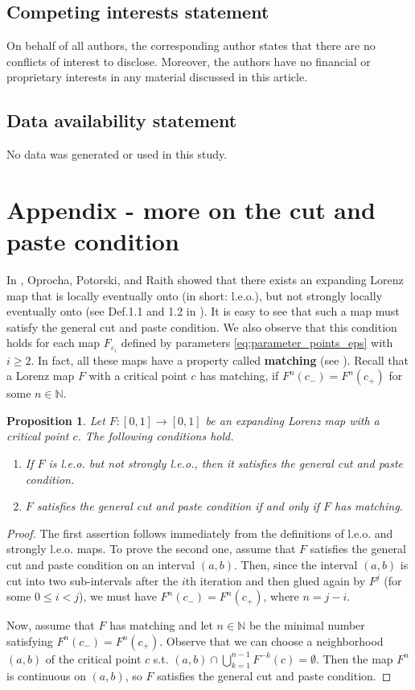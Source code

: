\documentclass[10pt,reqno]{amsart}
\theoremstyle{plain}
\theoremstyle{assumption}
\theoremstyle{notation}
\theoremstyle{claim}
\theoremstyle{conj}
\theoremstyle{theorem}
\theoremstyle{proposition}
\newtheorem{proposition}{Proposition}[section]
\theoremstyle{corollary}
\begin{document}
\subsection*{Competing interests statement}
On behalf of all authors, the corresponding author states that there are no conflicts of interest to disclose. Moreover, 
the authors have no financial or proprietary interests in any material discussed in this article.
\subsection*{Data availability statement}
No data was generated or used in this study.
\section{Appendix - more on the cut and paste condition}
\label{ex:map_nonsymmetric1}
In \cite{OPR}, Oprocha, Potorski, and Raith showed that there exists an expanding Lorenz map that is locally eventually onto (in short: l.e.o.), but not strongly locally eventually onto (see Def.1.1 and 1.2 in \cite{OPR}). It is easy to see that such a map must satisfy the general cut and paste condition. We also observe that this condition holds for each map $F_{\varepsilon_i}$ defined by parameters \eqref{eq:parameter_points_eps} with $i\geq2$. In fact, all these maps have a property called \textbf{matching} (see \cite{Bruin1,Bruin2}). Recall that a Lorenz map $F$ with a critical point $c$ has matching, if $F^n(c_-)=F^n(c_+)$ for some $n\in\mathbb{N}$.

\begin{proposition}\label{prop:cutandpaste}
    Let $F\colon[0,1]\to[0,1]$ be an expanding Lorenz map with a critical point $c$. The following conditions hold.
    \begin{enumerate}
        \item If $F$ is l.e.o. but not strongly l.e.o., then it satisfies the general cut and paste condition.
        \item $F$ satisfies the general cut and paste condition if and only if $F$ has matching.
    \end{enumerate}
\end{proposition}
\begin{proof}
    The first assertion follows immediately from the definitions of l.e.o. and strongly l.e.o. maps. To prove the second one, assume that $F$ satisfies the general cut and paste condition on an interval $(a,b)$. Then, since the interval $(a,b)$ is cut into two sub-intervals after the $i$th iteration and then glued again by $F^j$ (for some $0\leq i<j$), we must have $F^n(c_-)=F^n(c_+)$, where $n=j-i$.

    Now, assume that $F$ has matching and let $n\in\mathbb{N}$ be the minimal number satisfying $F^n(c_-)=F^n(c_+)$. Observe that we can choose a neighborhood $(a,b)$ of the critical point $c$ s.t. $(a,b)\cap\bigcup_{k=1}^{n-1}F^{-k}(c)=\emptyset$. Then the map $F^n$ is continuous on $(a,b)$, so $F$ satisfies the general cut and paste condition.
\end{proof}
\end{document}
